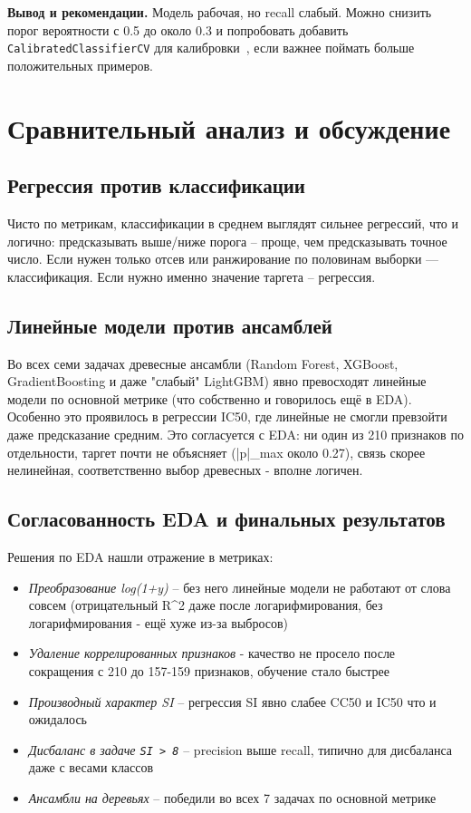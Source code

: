 \documentclass[12pt,a4paper]{report}
\begin{document}
\textbf{Вывод и рекомендации.} Модель рабочая, но recall слабый. Можно снизить порог вероятности с 0.5 до около 0.3 и попробовать добавить \texttt{CalibratedClassifierCV} для калибровки~\cite{habr-mlbootcamp}, если важнее поймать больше положительных примеров.

\chapter{Сравнительный анализ и обсуждение}

\section{Регрессия против классификации}

Чисто по метрикам, классификации в среднем выглядят сильнее регрессий, что и логично: предсказывать выше/ниже порога -- проще, чем предсказывать точное число. Если нужен только отсев или ранжирование по половинам выборки --- классификация. Если нужно именно значение таргета -- регрессия.

\section{Линейные модели против ансамблей}

Во всех семи задачах древесные ансамбли (Random Forest, XGBoost, GradientBoosting и даже "слабый" LightGBM) явно превосходят линейные модели по основной метрике (что собственно и говорилось ещё в EDA). Особенно это проявилось в регрессии IC50, где линейные не смогли превзойти даже предсказание средним. Это согласуется с EDA: ни один из 210 признаков по отдельности, таргет почти не объясняет (|p|\_max около 0.27),  связь скорее нелинейная, соответственно выбор древесных - вполне логичен.

\section{Согласованность EDA и финальных результатов}

Решения по EDA нашли отражение в метриках:
\begin{itemize}
    \item \emph{Преобразование log(1+y)} -- без него линейные модели не работают от слова совсем (отрицательный R\^{}2 даже после логарифмирования, без логарифмирования - ещё хуже из-за выбросов)
    \item \emph{Удаление коррелированных признаков} - качество не просело после сокращения с 210 до 157-159 признаков, обучение стало быстрее
    \item \emph{Производный характер SI} -- регрессия SI явно слабее CC50 и IC50 что и ожидалось
    \item \emph{Дисбаланс в задаче \texttt{SI > 8}} -- precision выше recall, типично для дисбаланса даже с весами классов
    \item \emph{Ансамбли на деревьях} -- победили во всех 7 задачах по основной метрике
\end{itemize}
\end{document}
